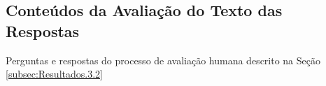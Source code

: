 \begin{apendicesenv}

\partapendices
\chapter{Conteúdos da Avaliação do Texto das Respostas}
\label{apendice:apendice1}
Perguntas e respostas do processo de avaliação humana descrito na Seção \ref{subsec:Resultados.3.2}

\end{apendicesenv}